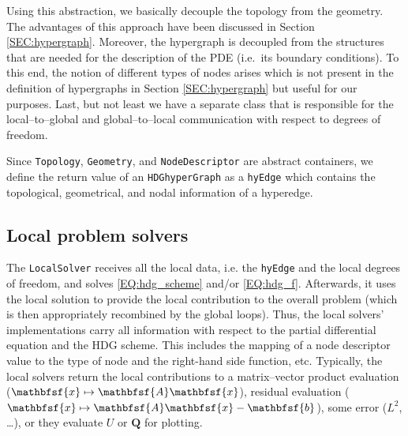 \documentclass[a4paper, english, 12pt, reqno, draft]{amsart}
\theoremstyle{definition}
\theoremstyle{remark}
\numberwithin{equation}{section}
\renewcommand{\vec}[1]{\ensuremath{\boldsymbol{#1}}}
\newcommand{\vecc}[1]{\ensuremath{\mathbfsf{#1}}}
\newcommand{\code}[1]{\texttt{#1}}
\begin{document}
% 
Using this abstraction, we basically decouple the topology from the geometry. The advantages of this approach have been discussed in Section \ref{SEC:hypergraph}. Moreover, the hypergraph is decoupled from the structures that are needed for the description of the PDE (i.e.\ its boundary conditions). To this end, the notion of different types of nodes arises which is not present in the definition of hypergraphs in Section \ref{SEC:hypergraph} but useful for our purposes. Last, but not least we have a separate class that is responsible for the local--to--global and global--to--local communication with respect to degrees of freedom.

Since \code{Topology}, \code{Geometry}, and \code{NodeDescriptor} are abstract containers, we define the return value of an \code{HDGhyperGraph} as a \code{hyEdge} which contains the topological, geometrical, and nodal information of a hyperedge.
% 
\subsection{Local problem solvers}
% 
The \code{LocalSolver} receives all the local data, i.e. the \code{hyEdge} and the local degrees of freedom, and solves \eqref{EQ:hdg_scheme} and/or \eqref{EQ:hdg_f}. Afterwards, it uses the local solution to provide the local contribution to the overall problem (which is then appropriately recombined by the global loops). Thus, the local solvers' implementations carry all information with respect to the partial differential equation and the HDG scheme. This includes the mapping of a node descriptor value to the type of node and the right-hand side function, etc. Typically, the local solvers return the local contributions to a matrix--vector product evaluation ($\vecc x \mapsto \vecc A \vecc x$), residual evaluation ($\vecc x \mapsto \vecc A \vecc x - \vecc b$), some error ($L^2$, \ldots), or they evaluate $U$ or $\vec Q$ for plotting.
% 
\end{document}
